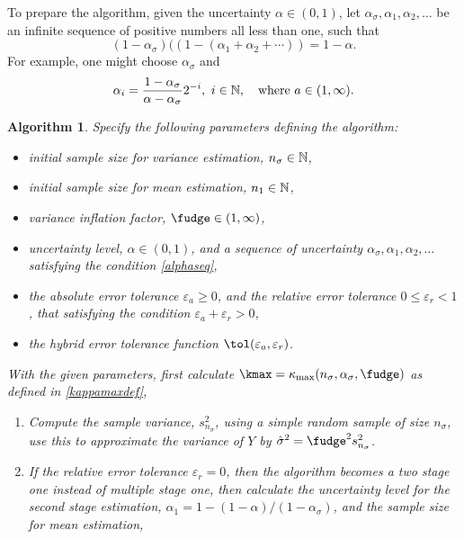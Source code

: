 \documentclass{iitthesis}
\newtheorem{algorithm}[theorem]{Algorithm}
\begin{document}
To prepare the algorithm, given the uncertainty $\alpha \in (0,1)$, let $\alpha_{\sigma}, \alpha_1,  \alpha_2, \ldots$ be an infinite sequence of positive numbers all less than one, such that 
\begin{equation} \label{alphaseq}
(1-\alpha_{\sigma})((1-(\alpha_1+\alpha_2+\cdots)) = 1-\alpha.
\end{equation}
For example, one might choose $\alpha_{\sigma}$ and 
\begin{equation} \label{alphaseqex}
\alpha_{i} = \frac{1-\alpha_\sigma}{\alpha-\alpha_\sigma} 2^{-i}, \ i\in \mathbb{N}, \quad \text{where} \  a \in (1,\infty).
\end{equation}
\begin{algorithm}\label{alg:meanMCg} 
Specify the following parameters defining the algorithm:
\begin{itemize}
\item initial sample size for variance estimation, $n_{\sigma} \in \mathbb{N}$,
\item initial sample size for mean estimation, $n_1 \in \mathbb{N}$,
\item variance inflation factor, $\fudge \in (1,\infty)$, 
\item uncertainty level, $\alpha\in (0,1)$, and a sequence of uncertainty $ \alpha_\sigma, \alpha_1,  \alpha_2, \ldots$ satisfying the condition \eqref{alphaseq}, 
\item the absolute error tolerance $\varepsilon_a \geq 0$, and the relative error tolerance $0 \leq \varepsilon_r <1$, that satisfying the condition $\varepsilon_a+\varepsilon_r >0$,
\item the hybrid error tolerance function $\tol(\varepsilon_a,\varepsilon_r)$.
\end{itemize} 
With the given parameters, first calculate $\kmax=\kappa_{\max}(n_\sigma,\alpha_\sigma,\fudge)$ as defined in \eqref{kappamaxdef}, 
\begin{enumerate}
\item Compute the sample variance, $s^2_{n_{\sigma}}$, using a simple random sample of size $n_\sigma$, use this to approximate the variance of $Y$ by $\hsigma^2 = \fudge^2 s^2_{n_\sigma}$. 
\item If the relative error tolerance $\varepsilon_r=0$, then the algorithm becomes a two stage one instead of multiple stage one, then calculate the uncertainty level for the second stage estimation, $\alpha_1 = 1-(1-\alpha)/(1-\alpha_\sigma)$, and the sample size for mean estimation,

\end{enumerate}
\end{algorithm}
\end{document}
